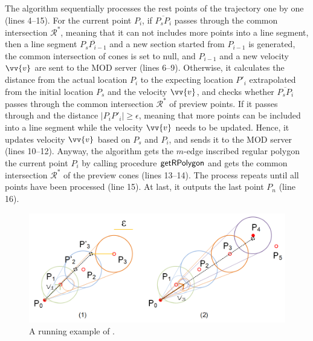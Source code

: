The algorithm sequentially processes the rest points of the trajectory one by one (lines 4--15). 
For the current point $P_{i}$, if $\overline{P_sP_{i}}$ passes through the common intersection $\mathcal{R}^*$, meaning that it can not includes more points into a line segment, then a line segment $\overline{P_sP_{i-1}}$ and a new section started from  $P_{i-1}$ is generated, the common intersection of cones is set to null, and $P_{i-1}$ and a new velocity $\vv{v}$ are sent to the MOD server (lines 6--9).
%
Otherwise, it calculates the distance from the actual location $P_{i}$ to the expecting location $P'_{i}$ extrapolated from the initial location $P_s$ and the velocity $\vv{v}$, and checks whether $\overline{P_sP_{i}}$ passes through the common intersection $\mathcal{R}^*$ of preview points.
If it passes through and the distance $|P_{i}P'_{i}| \ge \epsilon$, meaning that more points can be included into a line segment while the velocity $\vv{v}$ needs to be updated. Hence, it updates velocity $\vv{v}$ based on $P_s$ and $P_{i}$, and sends it to the MOD server (lines 10--12). 
%
Anyway, the algorithm gets the $m$-edge inscribed regular polygon \wrt the current point $P_{i}$ by calling procedure ${\mathsf{getRPolygon}}$ \cite{Lin:Cised} and gets the common intersection $\mathcal{R}^*$ of the preview cones (lines 13--14). The process repeats until all points have been processed (line 15).
At last, it outputs the last point $P_{n}$ (line 16).
%





\begin{figure}[tb!]
	\centering
	\includegraphics[scale=1.0]{figures/Fig-CITT.png}
	\vspace{-2ex}
	\caption{\small A running example of \citt. }
	\vspace{-3ex}
	\label{fig:citt}
\end{figure}


